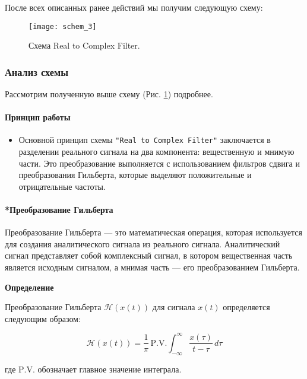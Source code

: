 \documentclass[a4paper,12pt]{extarticle}
\begin{document}
\vspace{0.2cm}После всех описанных ранее действий мы получим следующую схему:\\
\begin{figure}[H]
    \centering
    \texttt{[image: schem\_3]}
    \caption{Схема Real to Complex Filter.} %
    \label{fig:schem_3} %
\end{figure}

\subsubsection{Анализ схемы}

Рассмотрим полученную выше схему (Рис. \ref{fig:schem_3}) подробнее.

\paragraph{Принцип работы}

\begin{itemize}
    \item Основной принцип схемы \texttt{"Real to Complex Filter"} заключается в разделении реального 
    сигнала на два компонента: вещественную и мнимую части. Это преобразование выполняется с 
    использованием фильтров сдвига и преобразования Гильберта, которые выделяют положительные и 
    отрицательные частоты.
\end{itemize}

\paragraph{*Преобразование Гильберта}

Преобразование Гильберта — это математическая операция, которая используется для создания аналитического сигнала из реального сигнала. Аналитический сигнал представляет собой комплексный сигнал, в котором вещественная часть является исходным сигналом, а мнимая часть — его преобразованием Гильберта.

\textbf{Определение}

Преобразование Гильберта \( \mathcal{H}(x(t)) \) для сигнала \( x(t) \) определяется следующим образом:

\[
\mathcal{H}(x(t)) = \frac{1}{\pi} \, \mathrm{P.V.} \int_{-\infty}^{\infty} \frac{x(\tau)}{t - \tau} \, d\tau
\]

где \(\mathrm{P.V.}\) обозначает главное значение интеграла.
\end{document}
